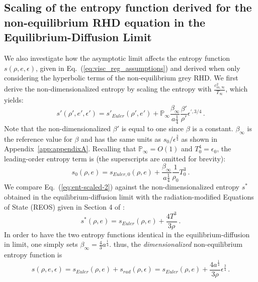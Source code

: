 \documentclass[review]{elsarticle}
\newcommand{\eqt}[1]{Eq.~(\ref{#1})}                     %
\newcommand{\app}[1]{Appendix~\ref{#1}}                     %
\renewcommand{\Re}{\textrm{Re}}
\renewcommand{\Re}{\mathbb{P}_\infty}
\newcommand{\tcr}[1]{\textcolor{red}{#1}}
\newcommand{\tcb}[1]{\textcolor{blue}{#1}}
\begin{document}
\subsection{Scaling of the entropy function derived for the non-equilibrium RHD equation in the Equilibrium-Diffusion Limit}\label{sect:ent-asym-limit}
%
We also investigate how the asymptotic limit affects the entropy function $s(\rho, e, \epsilon)$, given in \eqt{eq:visc_reg_assumptions} and derived when only considering the hyperbolic terms of the non-equilibrium grey RHD. We first derive the non-dimensionalized entropy by scaling the entropy with $\frac{c_{m,\infty}^2}{T_\infty}$, which yields:
%
\begin{equation}\label{eq:ent-scaled}
s' \left( \rho', e', \epsilon' \right) = s'_{Euler} \left( \rho', e' \right)+ \Re \frac{\beta_\infty}{a\frac{1}{4}} \frac{\beta'}{\rho'} \epsilon^{\prime,3/4} \,.
\end{equation}
%
Note that the non-dimensionalized $\beta'$ is equal to one since $\beta$ is a constant. $\beta_\infty$ is the reference value for $\beta$ and has the same units as $s_0 / \epsilon^\frac{3}{4}$ as shown in \app{app:appendixA}. Recalling that $\Re = O(1)$ and $T_0^4 = \epsilon_0$, the leading-order entropy term is (the superscripts are omitted for brevity):
%
\begin{equation}\label{eq:ent-scaled-2}
s_0 \left( \rho, e \right) = s_{Euler,0}\left( \rho, e \right) + \frac{\beta_\infty}{a\frac{1}{4}} \frac{1}{\rho_0} T_0^3 \ .
\end{equation}
%
We compare \eqt{eq:ent-scaled-2} against the non-dimensionalized entropy $s^*$ obtained in the equilibrium-diffusion limit with the radiation-modified Equations of State (REOS) given in Section 4 of \cite{LowrieMorel}:
%
\begin{equation}\label{eq:ent-reos}
s^*(\rho,e) = s_{Euler}(\rho,e) + \frac{4T^3}{3\rho} \ .
\end{equation}
%
In order to have the two entropy functions identical in the equilibrium-diffusion in limit, one simply sets $\beta_\infty = \frac{4}{3} a^\frac{1}{4}$. thus, the \emph{dimensionalized} non-equilibrium entropy function is 
%
\begin{equation}\label{eq:entropy}
s \left( \rho, e, \epsilon \right) = s_{Euler}\left( \rho, e \right) + s_{rad}(\rho,\epsilon)= s_{Euler}\left( \rho, e \right) + \frac{4a^\frac{1}{4}}{3\rho} \epsilon^\frac{3}{4} \,.
\end{equation}
\end{document}
